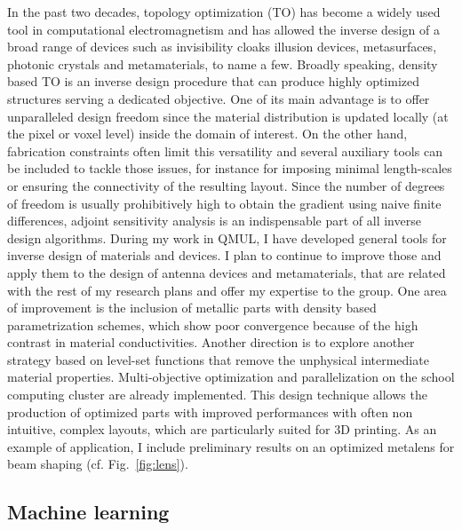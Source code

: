 \documentclass[11pt]{academia}
\begin{document}

In the past two decades, topology optimization (TO)
\autocite{bendsoeTopologyOptimizationTheory2013} has become a widely used
tool in computational electromagnetism
\autocite{moleskyInverseDesignNanophotonics2018} and has allowed the
inverse design of a broad range of devices such as invisibility cloaks
illusion devices\autocite{vialOptimizedMicrowaveIllusion2017},
metasurfaces,
photonic crystals
and metamaterials,
to name a few. Broadly speaking, density based TO is an inverse design
procedure that can produce highly optimized structures serving a
dedicated objective. One of its main advantage is to offer unparalleled
design freedom since the material distribution is updated locally (at
the pixel or voxel level) inside the domain of interest. On the other
hand, fabrication constraints often limit this versatility and several
auxiliary tools can be included to tackle those issues, for instance for
imposing minimal length-scales or ensuring the connectivity of the
resulting layout. Since the number of degrees of freedom is usually
prohibitively high to obtain the gradient using naive finite
differences, adjoint sensitivity analysis
\autocite{jensenTopologyOptimizationNanophotonics2010} is an indispensable
part of all inverse design algorithms. 
During my work in QMUL, I have developed general tools for inverse design of 
materials and devices. I plan to continue to improve those and apply them 
to the design of antenna devices and metamaterials, that are related with 
the rest of my research plans and offer my expertise to the group. 
One area of improvement is the inclusion of metallic parts 
with density based parametrization schemes, which show poor convergence 
because of the high contrast in material conductivities\autocite{aageTopologyOptimizationMetallic2010}. 
Another direction is to explore another strategy based on level-set functions 
that remove the unphysical intermediate material properties. 
Multi-objective optimization and parallelization on the school computing 
cluster are already implemented. This design technique allows the production 
of optimized parts with improved performances with often non intuitive, 
complex layouts, which are particularly suited for 3D printing. 
As an example of application, I include preliminary results on an optimized 
metalens for beam shaping (cf. Fig.~\ref{fig:lens}).

\subsection{Machine learning}
\end{document}
